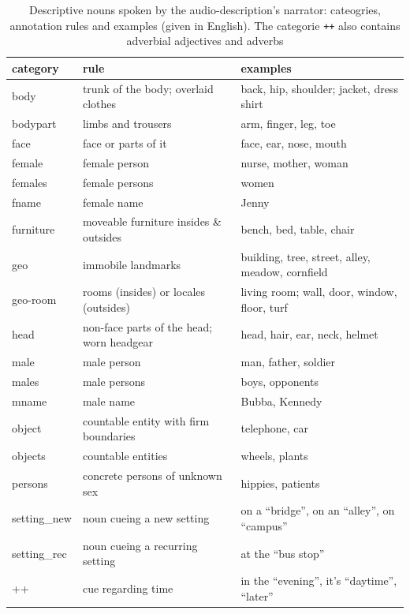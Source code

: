 \documentclass[english]{article}
\begin{document}
\begin{table}[t]
    \caption{Descriptive nouns spoken by the audio-description's narrator:
    cateogries, annotation rules and examples (given in English). The categorie
    \texttt{++} also contains adverbial adjectives and adverbs}
\label{tab:descr-nouns-rules}
\begin{tabular}{lll}
\toprule
\textbf{category} & \textbf{rule} & \textbf{examples} \\
\midrule
body & trunk of the body; overlaid clothes & back, hip, shoulder; jacket, dress
shirt \tabularnewline
bodypart & limbs and trousers & arm, finger, leg, toe \tabularnewline
face & face or parts of it & face, ear, nose, mouth \tabularnewline
female & female person & nurse, mother, woman \tabularnewline
females & female persons & women \tabularnewline
fname & female name & Jenny \tabularnewline
furniture & moveable furniture insides \& outsides & bench, bed, table, chair
\tabularnewline
geo & immobile landmarks & building, tree, street, alley, meadow, cornfield \tabularnewline
geo-room & rooms (insides) or  locales (outsides) & living room; wall, door, window, floor, turf \tabularnewline
head & non-face parts of the head; worn headgear & head, hair, ear, neck,
helmet \tabularnewline
male & male person & man, father, soldier \tabularnewline
males & male persons & boys, opponents \tabularnewline
mname & male name & Bubba, Kennedy \tabularnewline
object & countable entity with firm boundaries & telephone, car \tabularnewline
objects & countable entities & wheels, plants \tabularnewline
persons & concrete persons of unknown sex & hippies, patients \tabularnewline
setting\_new & noun cueing a new setting &  on a ``bridge'', on an ``alley'', on ``campus'' \tabularnewline
setting\_rec & noun cueing a recurring setting & at the ``bus stop'' \tabularnewline
++ & cue regarding time & in the ``evening'', it's ``daytime'', ``later'' \tabularnewline

\bottomrule
\end{tabular}
\end{table}
\end{document}
